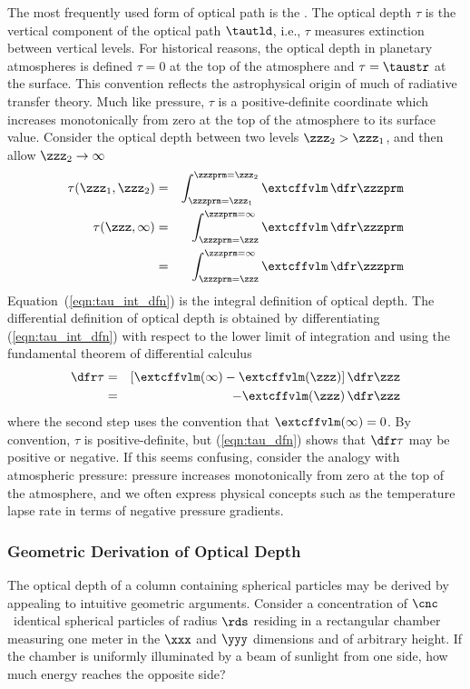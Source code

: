 \documentclass[12pt]{article}
\begin{document}
The most frequently used form of optical path is the . 
The optical depth $\tau$ is the vertical component of the optical path
$\tautld$, i.e., $\tau$ measures extinction between vertical levels.
For historical reasons, the optical depth in planetary atmospheres is
defined $\tau = 0$ at the top of the atmosphere and $\tau = \taustr$
at the surface. 
This convention reflects the astrophysical origin of much of radiative
transfer theory.
Much like pressure, $\tau$ is a positive-definite coordinate which
increases monotonically from zero at the top of the atmosphere to its
surface value. 
Consider the optical depth between two levels $\zzz_{2} > \zzz_{1}$, and
then allow $\zzz_{2} \rightarrow \infty$
\begin{eqnarray}
\tau(\zzz_{1},\zzz_{2}) & = & \int_{\zzzprm=\zzz_{1}}^{\zzzprm=\zzz_{2}}
\extcffvlm \,\dfr\zzzprm \nonumber \\
\tau(\zzz,\infty) & = & 
\int_{\zzzprm=\zzz}^{\zzzprm=\infty} \extcffvlm \,\dfr\zzzprm \\
 & = & 
\int_{\zzzprm=\zzz}^{\zzzprm=\infty} \extcffvlm \,\dfr\zzzprm
\label{eqn:tau_int_dfn}
\end{eqnarray}
Equation~(\ref{eqn:tau_int_dfn}) is the integral definition of optical
depth. 
The differential definition of optical depth is obtained by
differentiating (\ref{eqn:tau_int_dfn}) with respect to the lower
limit of integration and using the fundamental theorem of
differential calculus  
\begin{eqnarray}
\dfr\tau & = & [\extcffvlm(\infty) - \extcffvlm(\zzz)] \,\dfr\zzz \nonumber
\\
& = & -\extcffvlm(\zzz) \,\dfr\zzz
\label{eqn:tau_dfn}
\end{eqnarray}
where the second step uses the convention that $\extcffvlm(\infty) =
0$.  
By convention, $\tau$ is positive-definite, but
(\ref{eqn:tau_dfn}) shows that $\dfr\tau$ may be positive or
negative. 
If this seems confusing, consider the analogy with atmospheric
pressure: pressure increases monotonically from zero at the top of the
atmosphere, and we often express physical concepts such as the
temperature lapse rate in terms of negative pressure gradients.

\subsubsection[Geometric Derivation of Optical Depth]{Geometric Derivation of Optical Depth}\label{sxn:tau_geo}
The optical depth of a column containing spherical particles may be
derived by appealing to intuitive geometric arguments. 
Consider a concentration of $\cnc$\,\xmC\ identical spherical particles 
of radius $\rds$ residing in a rectangular chamber measuring one meter
in the $\xxx$ and $\yyy$ dimensions and of arbitrary height.
If the chamber is uniformly illuminated by a  beam
of sunlight from one side, how much energy reaches the opposite side?
\end{document}
